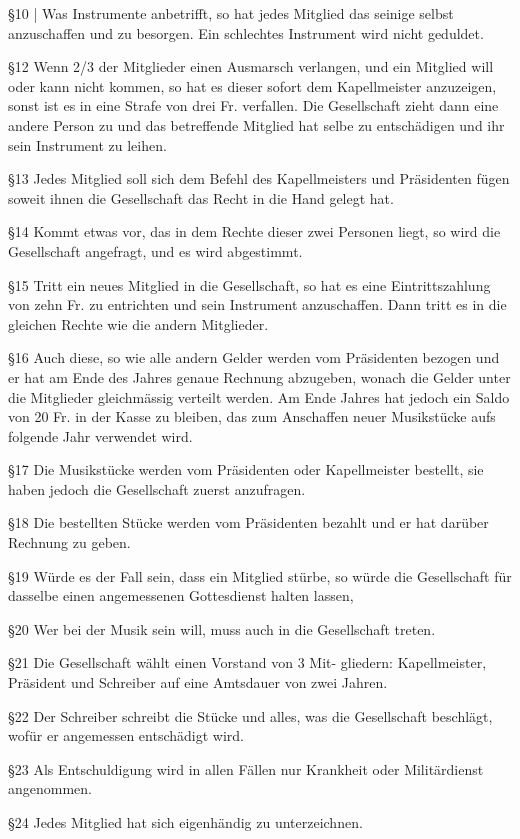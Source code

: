 \begin{multicols}{2}
    \S10 |
    Was Instrumente anbetrifft, so hat jedes Mitglied das
    seinige selbst anzuschaffen und zu besorgen. Ein
    schlechtes Instrument wird nicht geduldet.

    \S12
    Wenn 2/3 der Mitglieder einen Ausmarsch verlangen,
    und ein Mitglied will oder kann nicht kommen, so hat
    es dieser sofort dem Kapellmeister anzuzeigen, sonst
    ist es in eine Strafe von drei Fr. verfallen. Die Gesellschaft
    zieht dann eine andere Person zu und das betreffende Mitglied
    hat selbe zu entschädigen und ihr sein Instrument zu leihen.

    \S13
    Jedes Mitglied soll sich dem Befehl des Kapellmeisters
    und Präsidenten fügen soweit ihnen die Gesellschaft
    das Recht in die Hand gelegt hat.

    \S14
    Kommt etwas vor, das in dem Rechte dieser zwei Personen liegt,
    so wird die Gesellschaft angefragt, und es wird abgestimmt.

    \S15
    Tritt ein neues Mitglied in die Gesellschaft, so hat es eine
    Eintrittszahlung von zehn Fr. zu entrichten und sein Instrument
    anzuschaffen. Dann tritt es in die gleichen Rechte wie die andern Mitglieder.

    \S16
    Auch diese, so wie alle andern Gelder werden vom Präsidenten
    bezogen und er hat am Ende des Jahres genaue Rechnung abzugeben,
    wonach die Gelder unter die Mitglieder gleichmässig verteilt werden.
    Am Ende Jahres hat jedoch ein Saldo von 20 Fr. in der Kasse
    zu bleiben, das zum Anschaffen neuer Musikstücke
    aufs folgende Jahr verwendet wird.

    \S17
    Die Musikstücke werden vom Präsidenten oder Kapellmeister bestellt, sie
    haben jedoch die Gesellschaft zuerst anzufragen.

    \S18
    Die bestellten Stücke werden vom Präsidenten bezahlt
    und er hat darüber Rechnung zu geben.

    \S19
    Würde es der Fall sein, dass ein Mitglied stürbe, so
    würde die Gesellschaft für dasselbe einen angemessenen
    Gottesdienst halten lassen,

    \S20
    Wer bei der Musik sein will, muss auch in die Gesellschaft treten.

    \S21
    Die Gesellschaft wählt einen Vorstand von 3 Mit-
    gliedern: Kapellmeister, Präsident und Schreiber auf
    eine Amtsdauer von zwei Jahren.

    \S22
    Der Schreiber schreibt die Stücke und alles, was die
    Gesellschaft beschlägt, wofür er angemessen entschädigt
    wird.

    \S23
    Als Entschuldigung wird in allen Fällen nur Krankheit oder Militärdienst angenommen.

    \S24
    Jedes Mitglied hat sich eigenhändig zu unterzeichnen.\\


\end{multicols}
